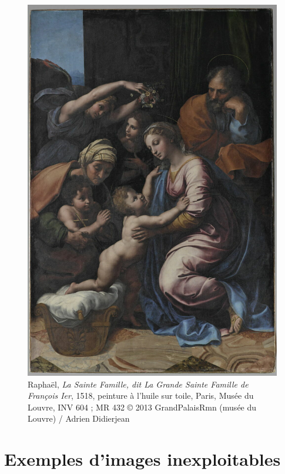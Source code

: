 \begin{figure}[H]
    \centering
    \includegraphics[height=0.4\textheight]{annexes/figures/ptrRaphaelSteFam.jpg}
    \caption{Raphaël, \textit{La Sainte Famille, dit La Grande Sainte Famille de François Ier}, 1518, peinture à l'huile sur toile, Paris, Musée du Louvre, INV 604 ; MR 432 © 2013 GrandPalaisRmn (musée du Louvre) / Adrien Didierjean}
    \label{fig:ptrRaphaelSteFam}
\end{figure}


\section{Exemples d'images inexploitables}

